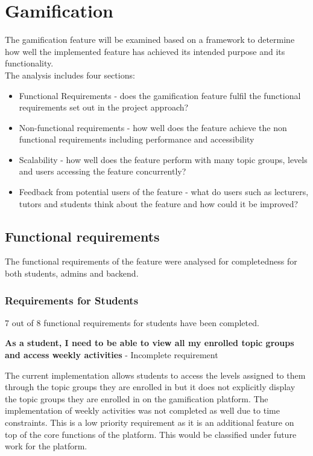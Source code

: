 \newpage
\section{Gamification}
The gamification feature will be examined based on a framework to determine how well the implemented feature has achieved its intended purpose and its functionality. \\

The analysis includes four sections:\\
\begin{itemize}
    \item Functional Requirements - does the gamification feature fulfil the functional requirements set out in the project approach?
    \item Non-functional requirements - how well does the feature achieve the non functional requirements including performance and accessibility
    \item Scalability - how well does the feature perform with many topic groups, levels and users accessing the feature concurrently?
    \item Feedback from potential users of the feature - what do users such as lecturers, tutors and students think about the feature and how could it be improved?
\end{itemize}

\subsection{Functional requirements}

The functional requirements of the feature were analysed for completedness for both students, admins and backend.

\subsubsection{Requirements for Students}
7 out of 8 functional requirements for students have been completed.

\textbf{As a student, I need to be able to view all my enrolled topic groups and access weekly activities} - Incomplete requirement

The current implementation allows students to access the levels assigned to them through the topic groups they are enrolled in but it does not explicitly display the topic groups they are enrolled in on the gamification platform. The implementation of weekly activities was not completed as well due to time constraints.  This is a low priority requirement as it is an additional feature on top of the core functions of the platform. This would be classified under future work for the platform.

